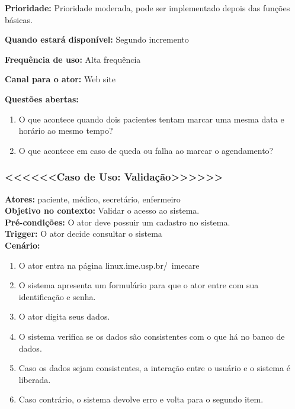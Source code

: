 \documentclass[12pt,a4paper]{report}
\begin{document}
\textbf{Prioridade:} Prioridade moderada, pode ser implementado depois das funções básicas.\newline

\textbf{Quando estará disponível:} Segundo incremento\newline

\textbf{Frequência de uso:} Alta frequência\newline

\textbf{Canal para o ator:} Web site\newline

\textbf{Questões abertas:}
\begin{enumerate}
\item O que acontece quando dois pacientes tentam marcar uma mesma data e horário ao mesmo tempo?
\item O que acontece em caso de queda ou falha ao marcar o agendamento?
\end{enumerate}



\subsubsection{<<<<<<Caso de Uso: Validação>>>>>>}

\textbf{Atores:} paciente, médico, secretário, enfermeiro\\

\textbf{Objetivo no contexto:} Validar o acesso ao sistema.\\

\textbf{Pré-condições:} O ator deve possuir um cadastro no sistema.\\

\textbf{Trigger:} O ator decide consultar o sistema\\

\textbf{Cenário:}
\begin{enumerate}
\item O ator entra na página linux.ime.usp.br/~imecare
\item O sistema apresenta um formulário para que o ator entre com sua identificação e senha.
\item O ator digita seus dados.
\item O sistema verifica se os dados são consistentes com o que há no banco de dados.
\item Caso os dados sejam consistentes, a interação entre o usuário e o sistema é liberada.
\item Caso contrário, o sistema devolve erro e volta para o segundo item.
\end{enumerate}
\end{document}
